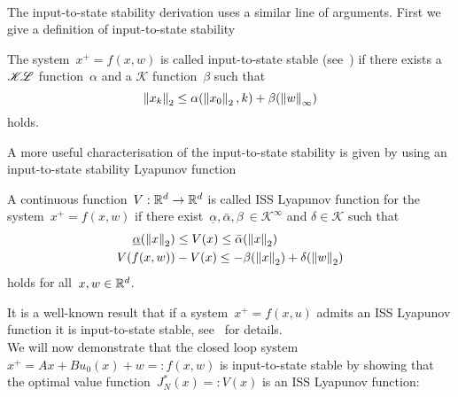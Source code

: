 %
\\[1em]
%
\mysplit The input-to-state stability derivation uses a similar line of arguments.
%
First we give a definition of input-to-state stability 
%
\begin{defi} 
The system~$x^+=f(x,w)$ is called input-to-state stable (see~\cite{Jiang:2001}) if there exists a $\mathscr K\!\mathscr L$ function~$\alpha$ and a $\mathscr K$ function~$\beta$ such that
%
\[
\left\|x_k\right\|_2\leq\alpha(\left\|x_0\right\|_2,k)+\beta(\left\|w\right\|_\infty)
\]
%
holds.
\end{defi}
%
\noindent A more useful characterisation of the input-to-state stability is given by using an input-to-state stability Lyapunov function
%
\begin{defi}
A continuous function~$V:\mathbb R^d\rightarrow\mathbb R^d$ is called ISS Lyapunov function for the system~$x^+=f(x,w)$ if there exist~$\underline{\alpha},\bar\alpha,\beta~\in\mathscr K^\infty$ and $\delta\in\mathscr K$ such that
\begin{align}
\underline\alpha(\left\|x\right\|_2)&\leq V(x)\leq \bar\alpha(\left\|x\right\|_2)\\
V(f(x,w))&-V(x)\leq -\beta(\left\|x\right\|_2)+\delta(\left\|w\right\|_2)
\end{align}
holds for all~$x,w\in\mathbb R^d$.
\end{defi}
%
\noindent It is a well-known result that if a system~$x^+=f(x,u)$ admits an ISS Lyapunov function it is input-to-state stable, see~\cite{Jiang:2001} for details.
%
\\[1em]
%
We will now demonstrate that the closed loop system~$x^+=Ax+Bu_0(x)+w =: f(x,w)$ is input-to-state stable by showing that the optimal value function~$J_N^\ast(x)=:V(x)$ is an ISS Lyapunov function:
%

